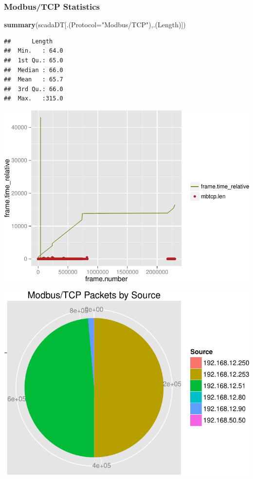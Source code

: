 \documentclass[]{article}
\newenvironment{Shaded}{\begin{snugshade}}{\end{snugshade}}
\newcommand{\KeywordTok}[1]{\textcolor[rgb]{0.13,0.29,0.53}{\textbf{{#1}}}}
\newcommand{\DataTypeTok}[1]{\textcolor[rgb]{0.13,0.29,0.53}{{#1}}}
\newcommand{\StringTok}[1]{\textcolor[rgb]{0.31,0.60,0.02}{{#1}}}
\newcommand{\NormalTok}[1]{{#1}}
\begin{document}
\pagebreak

\subsubsection{Modbus/TCP Statistics}\label{modbustcp-statistics}

\begin{Shaded}
\begin{Highlighting}[]
\KeywordTok{summary}\NormalTok{(scadaDT[.(}\DataTypeTok{Protocol=}\StringTok{"Modbus/TCP"}\NormalTok{),.(Length)])}
\end{Highlighting}
\end{Shaded}

\begin{verbatim}
##      Length     
##  Min.   : 64.0  
##  1st Qu.: 65.0  
##  Median : 66.0  
##  Mean   : 65.7  
##  3rd Qu.: 66.0  
##  Max.   :315.0
\end{verbatim}

\includegraphics{edaReport_files/figure-latex/unnamed-chunk-12-1.pdf}

\begin{center}\includegraphics{edaReport_files/figure-latex/unnamed-chunk-13-1} \end{center}
\end{document}

